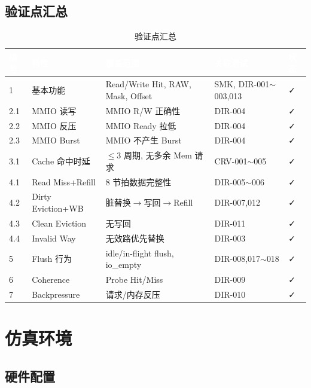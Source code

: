 \documentclass[12pt,a4paper]{ctexart}
\newcommand{\thcell}[1]{\textcolor{white}{\bfseries #1}}
\begin{document}
\subsection{验证点汇总}

\begin{table}[H]
\centering
\caption{验证点汇总}
\small
\renewcommand{\arraystretch}{1.2}
\begin{tabular}{@{}p{1cm}p{2.8cm}p{4cm}p{3cm}p{0.8cm}@{}}
\toprule
\rowcolor{primaryblue}
\thcell{编号} & \thcell{特性} & \thcell{覆盖范围} & \thcell{关联测试} & \thcell{状态} \\
\midrule
\rowcolor{rowgray} 1 & 基本功能 & Read/Write Hit, RAW, Mask, Offset & SMK, DIR-001$\sim$003,013 & ✓ \\
2.1 & MMIO 读写 & MMIO R/W 正确性 & DIR-004 & ✓ \\
\rowcolor{rowgray} 2.2 & MMIO 反压 & MMIO Ready 拉低 & DIR-004 & ✓ \\
2.3 & MMIO Burst & MMIO 不产生 Burst & DIR-004 & ✓ \\
\rowcolor{rowgray} 3.1 & Cache 命中时延 & $\le$3 周期, 无多余 Mem 请求 & CRV-001$\sim$005 & ✓ \\
4.1 & Read Miss+Refill & 8 节拍数据完整性 & DIR-005$\sim$006 & ✓ \\
\rowcolor{rowgray} 4.2 & Dirty Eviction+WB & 脏替换$\rightarrow$写回$\rightarrow$Refill & DIR-007,012 & ✓ \\
4.3 & Clean Eviction & 无写回 & DIR-011 & ✓ \\
\rowcolor{rowgray} 4.4 & Invalid Way & 无效路优先替换 & DIR-003 & ✓ \\
5 & Flush 行为 & idle/in-flight flush, io\_empty & DIR-008,017$\sim$018 & ✓ \\
\rowcolor{rowgray} 6 & Coherence & Probe Hit/Miss & DIR-009 & ✓ \\
7 & Backpressure & 请求/内存反压 & DIR-010 & ✓ \\
\bottomrule
\end{tabular}
\end{table}

\newpage

\section{仿真环境}

\subsection{硬件配置}
\end{document}
